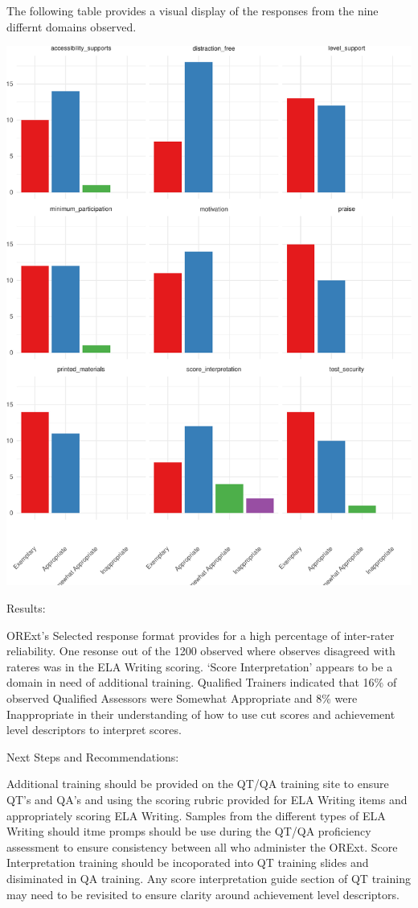 \documentclass[]{article}
\begin{document}
\clearpage
\FloatBarrier
The following table provides a visual display of the responses from the
nine differnt domains observed.

\includegraphics{tech_report_18_files/figure-latex/unnamed-chunk-2-1.pdf}

Results:

ORExt's Selected response format provides for a high percentage of
inter-rater reliability. One resonse out of the 1200 observed where
observes disagreed with rateres was in the ELA Writing scoring. `Score
Interpretation' appears to be a domain in need of additional training.
Qualified Trainers indicated that 16\% of observed Qualified Assessors
were Somewhat Appropriate and 8\% were Inappropriate in their
understanding of how to use cut scores and achievement level descriptors
to interpret scores.

Next Steps and Recommendations:

Additional training should be provided on the QT/QA training site to
ensure QT's and QA's and using the scoring rubric provided for ELA
Writing items and appropriately scoring ELA Writing. Samples from the
different types of ELA Writing should itme promps should be use during
the QT/QA proficiency assessment to ensure consistency between all who
administer the ORExt. Score Interpretation training should be
incoporated into QT training slides and disiminated in QA training. Any
score interpretation guide section of QT training may need to be
revisited to ensure clarity around achievement level descriptors.
\end{document}
